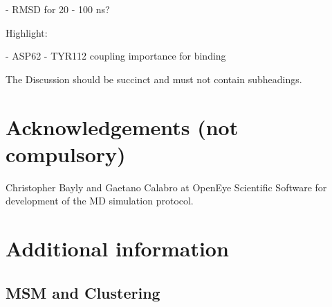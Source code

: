 \documentclass[fleqn,10pt]{wlscirep}
\begin{document}
     - RMSD for 20 - 100 ns?

Highlight:

  - ASP62 - TYR112 coupling importance for binding

The Discussion should be succinct and must not contain subheadings.





\section*{Acknowledgements (not compulsory)}

Christopher Bayly and Gaetano Calabro at OpenEye Scientific Software for development of the MD simulation protocol.



\section{Additional information}

\subsection{MSM and Clustering}
\end{document}

